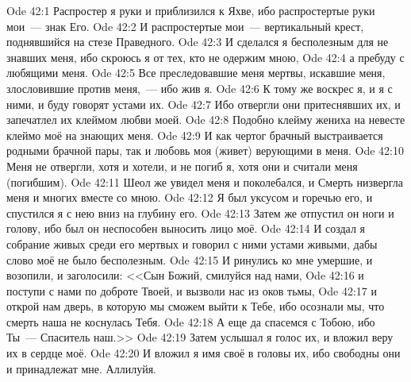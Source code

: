 \vs Ode 42:1
Распростер я
руки и приблизился к Яхве, ибо распростертые руки мои~--- знак Его.
\vs Ode 42:2
И
распростертые мои~--- вертикальный крест, поднявшийся на стезе Праведного.
\vs Ode 42:3
И сделался я
бесполезным для не знавших меня, ибо скроюсь я от тех, кто не одержим мною,
\vs Ode 42:4
а пребуду с
любящими меня.
\vs Ode 42:5
Все
преследовавшие меня мертвы, искавшие меня, злословившие против меня,~--- ибо жив
я.
\vs Ode 42:6
К тому же
воскрес я, и я с ними, и буду говорят устами их.
\vs Ode 42:7
Ибо отвергли
они притеснявших их, и запечатлел их клеймом любви моей.
\vs Ode 42:8
Подобно клейму
жениха на невесте клеймо моё на знающих меня.
\vs Ode 42:9
И как чертог
брачный выстраивается родными брачной пары, так и любовь моя (живет) верующими в
меня.
\vs Ode 42:10
Меня не
отвергли, хотя и хотели, и не погиб я, хотя они и считали меня (погибшим).
\vs Ode 42:11
Шеол же
увидел меня и поколебался, и Смерть низвергла меня и многих вместе со мною.
\vs Ode 42:12
Я был уксусом
и горечью его, и спустился я с нею вниз на глубину его.
\vs Ode 42:13
Затем же
отпустил он ноги и голову, ибо был он неспособен выносить лицо моё.
\vs Ode 42:14
И создал я
собрание живых среди его мертвых и говорил с ними устами живыми, дабы слово моё
не было бесполезным.
\vs Ode 42:15
И ринулись ко
мне умершие, и возопили, и заголосили:
<<Сын Божий, смилуйся над нами,
\vs Ode 42:16
и поступи с
нами по доброте Твоей, и вызволи нас из оков тьмы,
\vs Ode 42:17
и открой нам
дверь, в которую мы сможем выйти к Тебе, ибо осознали мы, что смерть наша не
коснулась Тебя.
\vs Ode 42:18
А еще да
спасемся с Тобою, ибо Ты~--- Спаситель наш.>>
\vs Ode 42:19
Затем услышал
я голос их, и вложил веру их в сердце моё.
\vs Ode 42:20
И вложил я
имя своё в головы их, ибо свободны они и принадлежат мне.
Аллилуйя.
